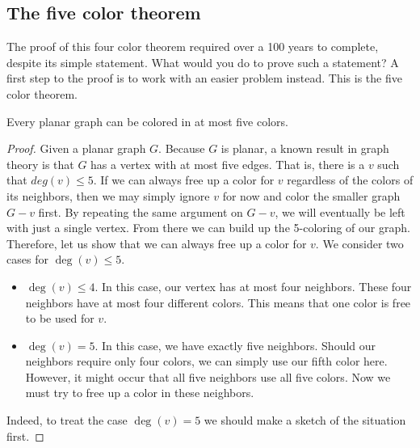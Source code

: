 \needspace{6cm}
\subsection{The five color theorem}

The proof of this four color theorem required over a 100 years to complete, despite its simple statement. What would you do to prove such a statement? A first step to the proof is to work with an easier problem instead. This is the five color theorem.

\begin{theorem}
    Every planar graph can be colored in at most five colors.
\end{theorem}

\begin{proof}
Given a planar graph $G$. Because $G$ is planar, a known result in graph theory is that $G$ has a vertex with at most five edges. That is, there is a $v$ such that $deg(v) \leq 5$. If we can always free up a color for $v$ regardless of the colors of its neighbors, then we may simply ignore $v$ for now and color the smaller graph $G-v$ first. By repeating the same argument on $G-v$, we will eventually be left with just a single vertex. From there we can build up the 5-coloring of our graph. Therefore, let us show that we can always free up a color for $v$. We consider two cases for $\deg(v) \leq 5$.

\begin{itemize}
    \item $\deg(v) \leq 4$. In this case, our vertex has at most four neighbors. These four neighbors have at most four different colors. This means that one color is free to be used for $v$.
    \item $\deg(v) = 5$. In this case, we have exactly five neighbors. Should our neighbors require only four colors, we can simply use our fifth color here. However, it might occur that all five neighbors use all five colors. Now we must try to free up a color in these neighbors.
\end{itemize}

Indeed, to treat the case $\deg(v)=5$ we should make a sketch of the situation first.


\end{proof}
